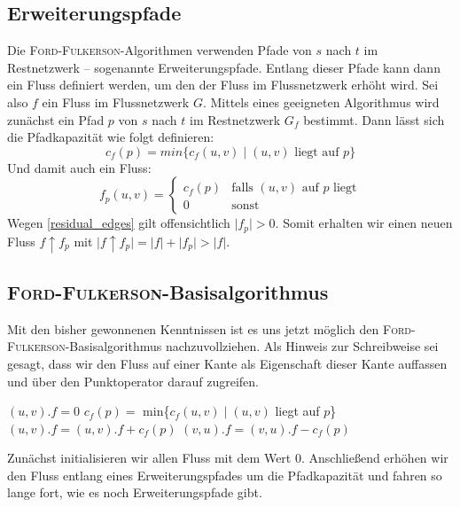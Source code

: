 \documentclass[12pt,a4paper,titlepage,onecolumn,ngerman]{scrartcl}
\theoremstyle{definition}
\theoremstyle{remark}
\newcommand{\ff}{\textsc{Ford-Fulkerson}}
\begin{document}
\subsection{Erweiterungspfade}
Die \ff -Algorithmen verwenden Pfade von $s$ nach $t$ im Restnetzwerk -- sogenannte Erweiterungspfade.
Entlang dieser Pfade kann dann ein Fluss definiert werden, um den der Fluss im Flussnetzwerk erhöht wird.
\medbreak
Sei also $f$ ein Fluss im Flussnetzwerk $G$.
Mittels eines geeigneten Algorithmus wird zunächst ein Pfad $p$ von $s$ nach $t$ im Restnetzwerk $G_f$ bestimmt.
Dann lässt sich die Pfadkapazität wie folgt definieren:
\begin{equation}
    c_f(p) = min\{ c_f(u,v)\mid (u,v) \text{ liegt auf $p$}\}
\end{equation}
\medbreak
Und damit auch ein Fluss:
\begin{equation}
    f_p(u,v) = \begin{cases}c_f(p) & \text{falls $(u,v)$ auf $p$ liegt}\\0 & \text{sonst}\end{cases}
\end{equation}
\medbreak
Wegen \eqref{residual_edges} gilt offensichtlich $\lvert f_p\rvert > 0$.
Somit erhalten wir einen neuen Fluss $f\uparrow f_p$ mit $\lvert f\uparrow f_p \rvert = \lvert f \rvert + \lvert f_p\rvert > \lvert f\rvert$. %

\subsection{\ff -Basisalgorithmus}
Mit den bisher gewonnenen Kenntnissen ist es uns jetzt möglich den \ff -Basisalgorithmus nachzuvollziehen.
Als Hinweis zur Schreibweise sei gesagt, dass wir den Fluss auf einer Kante als Eigenschaft dieser Kante auffassen und über den Punktoperator darauf zugreifen.
\begin{algorithm}[H]
    \caption{\ff (G,s,t)}
    \label{alg:ff}
\begin{algorithmic}[1]
    \State $(u,v).f = 0$
\EndFor
{}
    \State $c_{f}(p) =$ min\{$c_{f}(u,v) \mid (u,v)$ liegt auf $p$\}
            \State $(u,v).f = (u,v).f + c_{f}(p)$
        \Else
            \State $(v,u).f = (v,u).f - c_{f}(p)$
        \EndIf
    \EndFor
\EndWhile
\end{algorithmic}
\end{algorithm}
Zunächst initialisieren wir allen Fluss mit dem Wert $0$.
Anschließend erhöhen wir den Fluss entlang eines Erweiterungspfades um die Pfadkapazität und fahren so lange fort, wie es noch Erweiterungspfade gibt.
\end{document}
